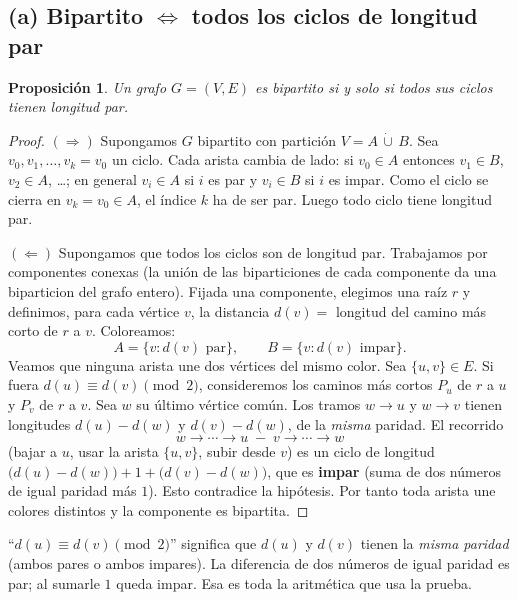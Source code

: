 \documentclass[11pt,a4paper]{article}
\theoremstyle{plain}
\newtheorem{proposicion}{Proposici\'on}
\theoremstyle{definition}
\begin{document}
\subsection*{(a) Bipartito $\Leftrightarrow$ todos los ciclos de longitud par}

\begin{proposicion}
Un grafo $G=(V,E)$ es bipartito si y solo si todos sus ciclos tienen longitud par.
\end{proposicion}

\begin{proof}
$(\Rightarrow)$ Supongamos $G$ bipartito con partici\'on $V=A\,\dot\cup\,B$. Sea
$v_0,v_1,\dots,v_k=v_0$ un ciclo. Cada arista cambia de lado: si $v_0\in A$ entonces
$v_1\in B$, $v_2\in A$, \dots; en general $v_i\in A$ si $i$ es par y $v_i\in B$ si $i$
es impar. Como el ciclo se cierra en $v_k=v_0\in A$, el \'indice $k$ ha de ser par.
Luego todo ciclo tiene longitud par.

$(\Leftarrow)$ Supongamos que todos los ciclos son de longitud par. Trabajamos por
componentes conexas (la uni\'on de las biparticiones de cada componente da una
biparticion del grafo entero). Fijada una componente, elegimos una ra\'iz $r$ y
definimos, para cada v\'ertice $v$, la distancia $d(v)=$ longitud del camino m\'as
corto de $r$ a $v$. Coloreamos:
\[
A=\{v: d(v)\text{ par}\},\qquad B=\{v: d(v)\text{ impar}\}.
\]
Veamos que ninguna arista une dos v\'ertices del mismo color. Sea $\{u,v\}\in E$. Si
fuera $d(u)\equiv d(v)\pmod 2$, considere\-mos los caminos m\'as cortos $P_u$ de $r$ a
$u$ y $P_v$ de $r$ a $v$. Sea $w$ su \'ultimo v\'ertice com\'un. Los tramos
$w\!\to\!u$ y $w\!\to\!v$ tienen longitudes $d(u)-d(w)$ y $d(v)-d(w)$, de la
\emph{misma} paridad. El recorrido
\[
w\to\cdots\to u \;-\; v\to\cdots\to w
\]
(bajar a $u$, usar la arista $\{u,v\}$, subir desde $v$) es un ciclo de longitud
$\big(d(u)-d(w)\big) + 1 + \big(d(v)-d(w)\big)$, que es \textbf{impar} (suma de dos
n\'umeros de igual paridad m\'as $1$). Esto contradice la hip\'otesis. Por tanto toda
arista une colores distintos y la componente es bipartita.
\end{proof}

\begin{concepto}
``$d(u)\equiv d(v)\pmod 2$'' significa que $d(u)$ y $d(v)$ tienen la \emph{misma
paridad} (ambos pares o ambos impares). La diferencia de dos n\'umeros de igual
paridad es par; al sumarle $1$ queda impar. Esa es toda la aritm\'etica que usa la
prueba.
\end{concepto}
\end{document}

